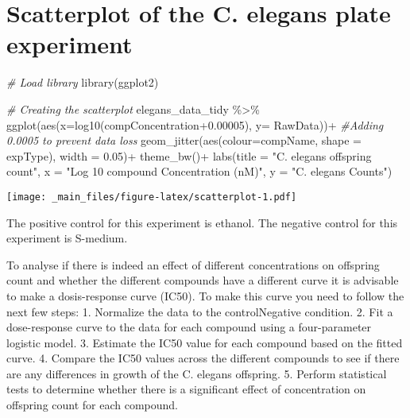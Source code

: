 \documentclass[
]{book}
\newenvironment{Shaded}{\begin{snugshade}}{\end{snugshade}}
\newcommand{\AttributeTok}[1]{\textcolor[rgb]{0.77,0.63,0.00}{#1}}
\newcommand{\CommentTok}[1]{\textcolor[rgb]{0.56,0.35,0.01}{\textit{#1}}}
\newcommand{\FloatTok}[1]{\textcolor[rgb]{0.00,0.00,0.81}{#1}}
\newcommand{\FunctionTok}[1]{\textcolor[rgb]{0.00,0.00,0.00}{#1}}
\newcommand{\NormalTok}[1]{#1}
\newcommand{\SpecialCharTok}[1]{\textcolor[rgb]{0.00,0.00,0.00}{#1}}
\newcommand{\StringTok}[1]{\textcolor[rgb]{0.31,0.60,0.02}{#1}}
\begin{document}
\hypertarget{scatterplot-of-the-c.-elegans-plate-experiment}{%
\section{Scatterplot of the C. elegans plate experiment}\label{scatterplot-of-the-c.-elegans-plate-experiment}}

\begin{Shaded}
\begin{Highlighting}[]
\CommentTok{\# Load library}
\FunctionTok{library}\NormalTok{(ggplot2)}

\CommentTok{\# Creating the scatterplot}
\NormalTok{elegans\_data\_tidy }\SpecialCharTok{\%\textgreater{}\%} \FunctionTok{ggplot}\NormalTok{(}\FunctionTok{aes}\NormalTok{(}\AttributeTok{x=}\FunctionTok{log10}\NormalTok{(compConcentration}\FloatTok{+0.00005}\NormalTok{), }\AttributeTok{y=}\NormalTok{ RawData))}\SpecialCharTok{+} \CommentTok{\#Adding 0.0005 to prevent data loss}
  \FunctionTok{geom\_jitter}\NormalTok{(}\FunctionTok{aes}\NormalTok{(}\AttributeTok{colour=}\NormalTok{compName, }\AttributeTok{shape =}\NormalTok{ expType), }\AttributeTok{width =} \FloatTok{0.05}\NormalTok{)}\SpecialCharTok{+}
  \FunctionTok{theme\_bw}\NormalTok{()}\SpecialCharTok{+}
  \FunctionTok{labs}\NormalTok{(}\AttributeTok{title =} \StringTok{"C. elegans offspring count"}\NormalTok{, }\AttributeTok{x =} \StringTok{"Log 10 compound Concentration (nM)"}\NormalTok{, }\AttributeTok{y =} \StringTok{"C. elegans Counts"}\NormalTok{)}
\end{Highlighting}
\end{Shaded}

\texttt{[image: \_main\_files/figure-latex/scatterplot-1.pdf]}

The positive control for this experiment is ethanol. The negative control for this experiment is S-medium.

To analyse if there is indeed an effect of different concentrations on offspring count and whether the different compounds have a different curve it is advisable to make a dosis-response curve (IC50). To make this curve you need to follow the next few steps:
1. Normalize the data to the controlNegative condition.
2. Fit a dose-response curve to the data for each compound using a four-parameter logistic model.
3. Estimate the IC50 value for each compound based on the fitted curve.
4. Compare the IC50 values across the different compounds to see if there are any differences in growth of the C. elegans offspring.
5. Perform statistical tests to determine whether there is a significant effect of concentration on offspring count for each compound.
\end{document}
